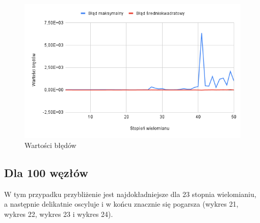 \documentclass{article}
\begin{document}
\begin{figure}[H]
  \centering
  \begin{minipage}[b]{0.4\textwidth}
    \includegraphics[width=\textwidth]{img22.png}
    \caption{Wartości błędów}
  \end{minipage}
\end{figure}

\newpage

\subsection{Dla 100 węzłów}

W tym przypadku przybliżenie jest najdokładniejsze dla 23 stopnia wielomianiu, a następnie delikatnie oscyluje i w końcu znacznie się pogarsza (wykres 21, wykres 22, wykres 23 i wykres 24).
\end{document}
